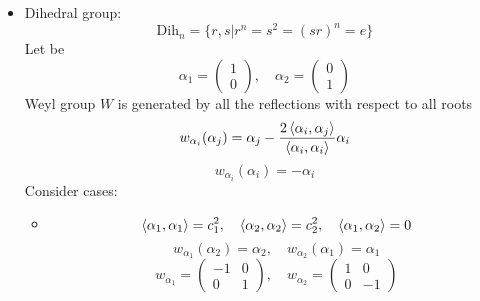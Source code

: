 \documentclass[12pt]{article}
\theoremstyle{definition}
\begin{document}
\begin{enumerate}
\begin{itemize}
\begin{itemize}
        \end{itemize}
        \item Dihedral group:
        \begin{equation}
            \text{Dih}_n=\{r,s|r^n=s^2=(sr)^n=e\}
        \end{equation}
        Let be
        \begin{equation}
            \alpha_1=\begin{pmatrix}
                1\\
                0
            \end{pmatrix},\quad \alpha_2=\begin{pmatrix}
                0\\
                1
            \end{pmatrix}
        \end{equation}
        Weyl group $W$ is generated by all the reflections with respect to all roots
        \begin{equation}
            w_{\alpha_i}(\alpha_j)=\alpha_j-\frac{2\braket{\alpha_i,\alpha_j}}{\braket{\alpha_i,\alpha_i}}\alpha_i
        \end{equation}
        \begin{equation}
            w_{\alpha_i}(\alpha_i)=-\alpha_i
        \end{equation}
        Consider cases:
        \begin{itemize}
            \item 
            \begin{equation}
                \braket{\alpha_1,\alpha_1}=c_1^2,\quad\braket{\alpha_2,\alpha_2}=c_2^2,\quad\braket{\alpha_1,\alpha_2}=0
            \end{equation}
            \begin{equation}
                w_{\alpha_1}(\alpha_2)=\alpha_2,\quad w_{\alpha_2}(\alpha_1)=\alpha_1
            \end{equation}
            \begin{equation}
                w_{\alpha_1}=\begin{pmatrix}
                    -1 & 0\\
                    0 & 1
                \end{pmatrix},\quad w_{\alpha_2}=\begin{pmatrix}
                    1 & 0\\
                    0 & -1
                \end{pmatrix}
            \end{equation}

\end{itemize}
\end{itemize}
\end{enumerate}
\end{document}
